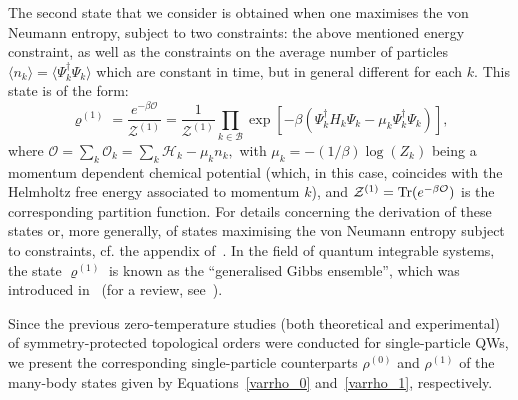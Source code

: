 The second state that we consider is obtained when one maximises the von Neumann entropy, subject to two constraints: the above mentioned energy constraint, as well as the constraints on the average number of particles $\langle n_k\rangle=\langle\Psi_k^{\dagger} \Psi_k\rangle$ which are constant in time, but in general different for each $k$. This state is of the form: 
\begin{equation}
\label{varrho_1}
\varrho^{(1)}=\frac{e^{-\beta \mathcal{O}}}{\mathcal{Z}^{(1)}} = \frac{1}{\mathcal{Z}^{(1)}} \prod_{k\in \mathcal{B}} \exp[-\beta (\Psi_k^{\dagger} H_k\Psi_k-\mu_k\Psi_k^{\dagger}\Psi_k)],	
\end{equation}
where $\mathcal{O}=\sum_k \mathcal{O}_k=\sum_k\mathcal{H}_k-\mu_k n_k,$ with $\mu_k=-(1/\beta)\log(Z_k)$ being a momentum dependent chemical potential (which, in this case, coincides with the Helmholtz free energy associated to momentum $k$), and $\mathcal{Z}^{(1)} = \text{Tr}(e^{-\beta\mathcal{O}})$ is the corresponding partition function. For details concerning the derivation of these states or, more generally, of states maximising the von Neumann entropy subject to constraints, cf. the appendix of~\cite{vie:10}. In the field of quantum integrable systems, the state $\varrho^{(1)}$ is known as the ``generalised Gibbs ensemble'', which was introduced in~\cite{rig:dun:yur:ols:07,rig:mur:ols:06} (for a review, see~\cite{vid:rig:16}).

Since the previous zero-temperature studies (both theoretical and experimental) of symmetry-protected topological orders were conducted for single-particle QWs, we present the corresponding single-particle counterparts $\rho^{(0)}$ and $\rho^{(1)}$ of the many-body states given by Equations~\eqref{varrho_0} and~\eqref{varrho_1}, respectively. 


